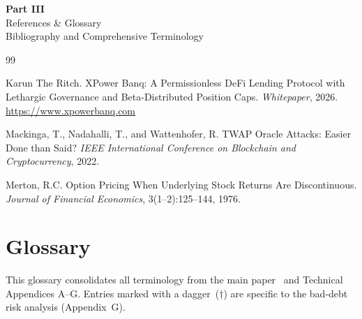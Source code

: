 \documentclass[10pt,a4paper,twocolumn]{article}
\theoremstyle{definition}
\theoremstyle{plain}
\theoremstyle{remark}
\begin{document}
\clearpage
\onecolumn
\thispagestyle{empty}
\vspace*{\fill}
\begin{center}
  {\fontsize{36}{42}\selectfont\bfseries Part III}\\[1.5em]
  {\LARGE References \& Glossary}\\[1em]
  {\large\color{codegray} Bibliography and Comprehensive Terminology}
\end{center}
\vspace*{\fill}
\clearpage
\twocolumn

\begin{thebibliography}{99}


Karun The Ritch.
\newblock XPower Banq: A Permissionless DeFi Lending Protocol with Lethargic Governance and Beta-Distributed Position Caps.
\newblock \emph{Whitepaper}, 2026.
\newblock \url{https://www.xpowerbanq.com}


Mackinga, T., Nadahalli, T., and Wattenhofer, R.
\newblock TWAP Oracle Attacks: Easier Done than Said?
\newblock \emph{IEEE International Conference on Blockchain and Cryptocurrency}, 2022.

Merton, R.C.
\newblock Option Pricing When Underlying Stock Returns Are Discontinuous.
\newblock \emph{Journal of Financial Economics}, 3(1--2):125--144, 1976.

\end{thebibliography}

\section*{Glossary}
\label{apx:glossary}

\noindent This glossary consolidates all terminology from the main paper~\cite{wp} and Technical Appendices A--G. Entries marked with a dagger~($\dagger$) are specific to the bad-debt risk analysis (Appendix~G).
\end{document}
